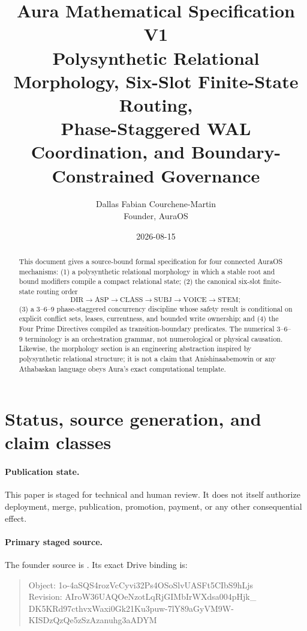 \documentclass[11pt]{article}
\title{Aura Mathematical Specification V1\\
\large Polysynthetic Relational Morphology, Six-Slot Finite-State Routing,\\
Phase-Staggered WAL Coordination, and Boundary-Constrained Governance}
\author{Dallas Fabian Courchene-Martin\\Founder, AuraOS}
\date{2026-08-15}
\begin{document}
\maketitle

\begin{abstract}
This document gives a source-bound formal specification for four connected AuraOS
mechanisms: (1) a polysynthetic relational morphology in which a stable root and
bound modifiers compile a compact relational state; (2) the canonical six-slot
finite-state routing order
\[
\mathrm{DIR}\rightarrow\mathrm{ASP}\rightarrow\mathrm{CLASS}\rightarrow
\mathrm{SUBJ}\rightarrow\mathrm{VOICE}\rightarrow\mathrm{STEM};
\]
(3) a 3--6--9 phase-staggered concurrency discipline whose safety result is
conditional on explicit conflict sets, leases, currentness, and bounded write
ownership; and (4) the Four Prime Directives compiled as transition-boundary
predicates.  The numerical 3--6--9 terminology is an orchestration grammar, not
numerological or physical causation.  Likewise, the morphology section is an
engineering abstraction inspired by polysynthetic relational structure; it is
not a claim that Anishinaabemowin or any Athabaskan language obeys Aura's exact
computational template.
\end{abstract}

\section*{Status, source generation, and claim classes}

\paragraph{Publication state.}
This paper is staged for technical and human review.  It does not itself
authorize deployment, merge, publication, promotion, payment, or any other
consequential effect.

\paragraph{Primary staged source.}
The founder source is .
Its exact Drive binding is:
\begin{quote}\scriptsize\ttfamily
Object: 1o-4aSQS4rozVcCyvi32Ps4OSoSlvUASFt5CIbS9hLjs\\
Revision: AIroW36UAQOeNzotLqRjGIMbIrWXdsa004pHjk\_\\
DK5KRd97cthvxWaxi0Gk21Ku3puw-7lY89aGyVM9W-KISDzQzQe5zSzAzanuhg3aADYM
\end{quote}
\end{document}
